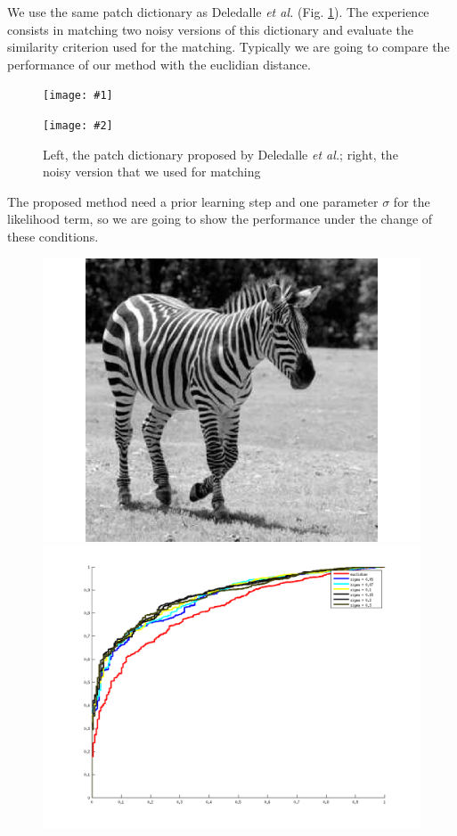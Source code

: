 \documentclass[runningheads]{llncs}
\newcommand{\insertTwoF}[5]{
  \begin{figure}[h!]
    \centering
    \begin{minipage}{#4\linewidth}
    \texttt{[image: \#1]}
    \end{minipage}
    \begin{minipage}{#4\linewidth}
    \texttt{[image: \#2]}
    \end{minipage}
      \caption{#3}
      \label{#5}
  \end{figure}  
}
\begin{document}
We use the same patch dictionary as Deledalle \textit{et al.}\cite{Deledalle:2012} (Fig. \ref{dico}). The experience consists in matching two noisy versions of this dictionary and evaluate the similarity criterion used for the matching. Typically we are going to compare the performance of our method with the euclidian distance. 
\insertTwoF{dico}{dico_noise}{Left, the patch dictionary proposed by Deledalle \textit{et al.}\cite{Deledalle:2012}; right, the noisy version that we used for matching}{0.45}{dico}
The proposed method need a prior learning step and one parameter $\sigma$ for the likelihood term, so we are going to show the performance under the change of these conditions.
  \begin{figure}[!h]
    \centering
    \begin{minipage}{0.45\linewidth}
    \includegraphics[width=\linewidth]{zebra}
    \end{minipage}
    \begin{minipage}{0.45\linewidth}
    \includegraphics[width=\linewidth]{perf_zebra_max}

\end{minipage}
\end{figure}
\end{document}

